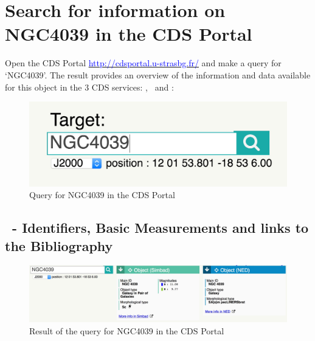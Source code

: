 \documentclass [a4paper, 12pt]{article}
\begin{document}
\section{Search for information on NGC4039 in the CDS Portal}

Open the CDS Portal
\hyperref[http://cdsportal.u-strasbg.fr/]{\textcolor{blue}{http://cdsportal.u-strasbg.fr/}}
and make a query for `NGC4039'.
The result provides an overview of the information and data available for
this object in the 3 CDS services: \simbad, \aladin\ and \vizier:

\begin{figure}[H]
\center
\includegraphics[width=0.5  \textwidth]{../images/cdsportal_search_ngc4039.jpg}
\caption{Query for NGC4039 in the CDS Portal}
\label{fig:cdsportal1}
\end{figure}

\subsection{\simbad\ - Identifiers, Basic Measurements and links to the
Bibliography}

\begin{figure}[H]
    \center
    \includegraphics[width=1
    \textwidth]{../images/cdsportal_object-information_ngc4039.jpg}
    \caption{Result of the query for NGC4039 in the CDS Portal}
    \label{fig:cdsportal2}
\end{figure}
\end{document}
